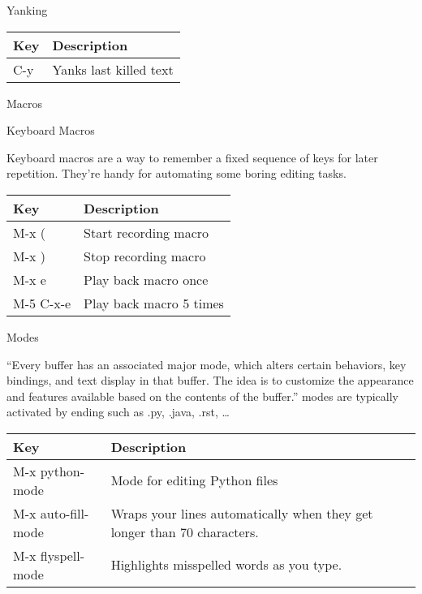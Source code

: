 Yanking

\begin{longtable}[]{ll}
\toprule
Key & Description\tabularnewline
\midrule
\endhead
C-y & Yanks last killed text\tabularnewline
\bottomrule
\end{longtable}

Macros

Keyboard Macros

Keyboard macros are a way to remember a fixed sequence of keys for later
repetition. They're handy for automating some boring editing tasks.

\begin{longtable}[]{ll}
\toprule
Key & Description\tabularnewline
\midrule
\endhead
M-x ( & Start recording macro\tabularnewline
M-x ) & Stop recording macro\tabularnewline
M-x e & Play back macro once\tabularnewline
M-5 C-x-e & Play back macro 5 times\tabularnewline
\bottomrule
\end{longtable}

Modes

``Every buffer has an associated major mode, which alters certain
behaviors, key bindings, and text display in that buffer. The idea is to
customize the appearance and features available based on the contents of
the buffer.'' modes are typically activated by ending such as .py,
.java, .rst, \ldots{}

\begin{longtable}[]{ll}
\toprule
Key & Description\tabularnewline
\midrule
\endhead
M-x python-mode & Mode for editing Python files\tabularnewline
M-x auto-fill-mode & Wraps your lines automatically when they get longer
than 70 characters.\tabularnewline
M-x flyspell-mode & Highlights misspelled words as you type.\tabularnewline
\bottomrule
\end{longtable}
